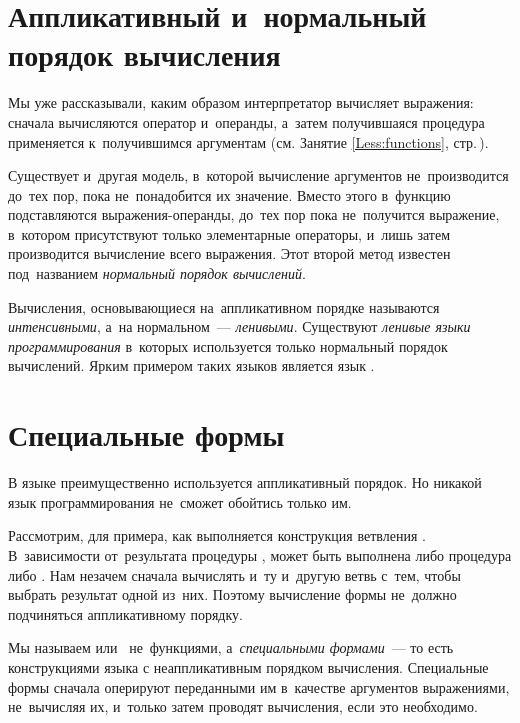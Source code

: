 \label{Less:delayed-computation}

\section[4]{Аппликативный и~нормальный порядок вычисления}%
\label{normal-order}Мы уже рассказывали, каким образом интерпретатор \Scheme вычисляет выражения: сначала вычисляются оператор и~операнды, а~затем получившаяся процедура применяется к~получившимся аргументам (см. Занятие \ref{Less:functions}, стр.\,\pageref{applicative-order}).

Существует и~другая модель, в~которой вычисление аргументов не~производится до~тех пор, пока не~понадобится их значение. Вместо этого в~функцию подставляются выражения-операнды, до~тех пор пока не~получится выражение, в~котором присутствуют только элементарные операторы, и~лишь затем производится вычисление всего выражения. Этот второй метод известен под~названием \emph{нормальный порядок вычислений}.

Вычисления, основывающиеся на~аппликативном порядке называются \emph{интенсивными}, а~на нормальном~--- \emph{ленивыми}. Существуют \emph{ленивые языки программирования} в~которых используется только нормальный порядок вычислений. Ярким примером таких языков является язык .

\section[2]{Специальные формы}%
В языке \Scheme преимущественно используется аппликативный порядок. Но никакой язык программирования не~сможет обойтись только им. 

Рассмотрим, для примера, как выполняется конструкция ветвления . В~зависимости от~результата процедуры , может быть выполнена либо процедура  либо . Нам незачем сначала вычислять и~ту и~другую ветвь с~тем, чтобы выбрать результат одной из~них. Поэтому вычисление формы  не~должно подчиняться аппликативному порядку. 

Мы называем  или~ не~функциями, а~\emph{специальными формами}~--- то есть конструкциями языка с неаппликативным порядком вычисления. Специальные формы сначала оперируют переданными им в~качестве аргументов выражениями, не~вычисляя их, и~только затем проводят вычисления, если это необходимо.

